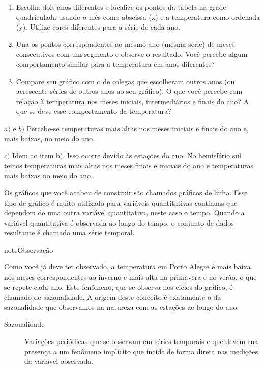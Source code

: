 \begin{enumerate}
\item {} 
Escolha dois anos diferentes e localize os pontos da tabela na grade quadriculada usando o mês como abscissa (x) e a temperatura como ordenada (y). Utilize cores diferentes para a série de cada ano.

\item {} 
Una os pontos correspondentes ao mesmo ano (mesma série) de meses consecutivos com um segmento e observe o resultado. Você percebe algum comportamento similar para a  temperatura em anos diferentes?

\item {} 
Compare seu gráfico com o de colegas que escolheram outros anos (ou acrescente séries de outros anos ao seu gráfico). O que você percebe com relação à temperatura nos meses iniciais, intermediários e finais do ano?  A que se deve esse comportamento da temperatura?

\end{enumerate}

\(a)\) e \(b)\) Percebe-se temperaturas mais altas nos meses iniciais e finais do ano e, mais baixas, no meio do ano.
\begin{quote}

\begin{figure}[H]
\centering

\noindent{}
\end{figure}
\end{quote}

\(c)\) Idem ao item b). Isso ocorre devido às estações do ano. No hemisfério sul temos temperaturas mais altas nos meses finais e iniciais do ano e temperaturas mais baixas no meio do ano.

Os gráficos que você acabou de construir são chamados gráficos de linha. Esse tipo de gráfico é muito utilizado para variáveis quantitativas contínuas que dependem de uma outra variável quantitativa, neste caso o tempo. Quando a variável quantitativa é observada ao longo do tempo, o conjunto de dados resultante é chamado uma série temporal.

\begin{sphinxadmonition}{note}{Observação}

Como você já deve ter observado, a temperatura em Porto Alegre é mais baixa nos meses correspondentes ao inverno e mais alta na primavera e no verão, o que se repete cada ano. Este fenômeno, que se observa nos ciclos do gráfico, é chamado de sazonalidade. A origem deste conceito é exatamente o da sazonalidade que observamos na natureza com as estações ao longo do ano.
\end{sphinxadmonition}
\begin{description}
\item[{Sazonalidade}] \leavevmode{}\label{\detokenize{PE103-3:term-sazonalidade}}
Variações periódicas que se observam em séries temporais e que devem sua presença a um fenômeno implícito que incide de forma direta nas medições da variável observada.

\end{description}

